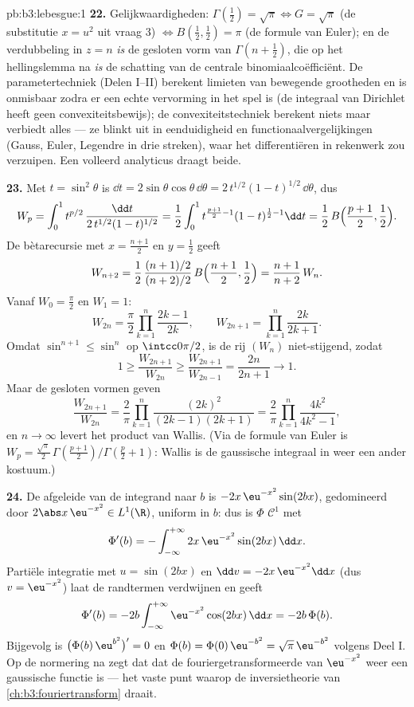 \begin{solution}{pb:b3:lebesgue:1}
\textbf{22.} Gelijkwaardigheden: $\Gamma(\frac12) = \sqrt\pi
\Leftrightarrow G = \sqrt\pi$ (de substitutie $x = u^2$ uit vraag
3) $\Leftrightarrow B(\frac12, \frac12) = \pi$ (de formule van
Euler); en de verdubbeling in $z = n$ \emph{is} de gesloten vorm
van $\Gamma(n + \frac12)$, die op het hellingslemma na \emph{is}
de schatting van de centrale binomiaalcoëfficiënt. De
parametertechniek (Delen I--II) berekent limieten van bewegende
grootheden en is onmisbaar zodra er een echte vervorming in het
spel is (de integraal van Dirichlet heeft geen convexiteitsbewijs);
de convexiteitstechniek berekent niets maar verbiedt alles --- ze
blinkt uit in eenduidigheid en functionaalvergelijkingen (Gauss,
Euler, Legendre in drie streken), waar het differentiëren in
rekenwerk zou verzuipen. Een volleerd analyticus draagt beide.

\textbf{23.} Met $t = \sin^2\theta$ is $\dd t =
2\sin\theta\cos\theta\,\dd\theta = 2\,t^{1/2}(1-t)^{1/2}\,
\dd\theta$, dus
\[
W_p = \int_0^1 t^{p/2}\,
\frac{\dd t}{2\,t^{1/2}(1-t)^{1/2}}
= \frac12\int_0^1 t^{\frac{p+1}2 - 1}(1-t)^{\frac12 - 1}\dd t
= \frac12\,B\Bigl(\frac{p+1}2, \frac12\Bigr).
\]
De bètarecursie met $x = \frac{n+1}2$ en $y = \frac12$ geeft
\[
W_{n+2} = \frac12\,
\frac{(n+1)/2}{(n+2)/2}\,B\Bigl(\frac{n+1}2, \frac12\Bigr)
= \frac{n+1}{n+2}\,W_n .
\]
Vanaf $W_0 = \frac\pi2$ en $W_1 = 1$:
\[
W_{2n} = \frac\pi2\prod_{k=1}^n\frac{2k-1}{2k},
\qquad
W_{2n+1} = \prod_{k=1}^n\frac{2k}{2k+1} .
\]
Omdat $\sin^{n+1} \leq \sin^n$ op $\intcc0{\pi/2}$, is de rij
$(W_n)$ niet-stijgend, zodat
\[
1 \geq \frac{W_{2n+1}}{W_{2n}} \geq
\frac{W_{2n+1}}{W_{2n-1}} = \frac{2n}{2n+1}
\longrightarrow 1 .
\]
Maar de gesloten vormen geven
\[
\frac{W_{2n+1}}{W_{2n}} = \frac2\pi
\prod_{k=1}^n\frac{(2k)^2}{(2k-1)(2k+1)}
= \frac2\pi\prod_{k=1}^n\frac{4k^2}{4k^2-1},
\]
en $n \to \infty$ levert het product van Wallis. (Via de formule
van Euler is $W_p = \frac{\sqrt\pi}2\,
\Gamma(\frac{p+1}2)/\Gamma(\frac p2 + 1)$: Wallis is de gaussische
integraal in weer een ander kostuum.)

\textbf{24.} De afgeleide van de integrand naar $b$ is
$-2x\,\eu^{-x^2}\sin(2bx)$, gedomineerd door $2\abs
x\,\eu^{-x^2} \in L^1(\R)$, uniform in $b$: dus is $\Phi$
$\mathcal C^1$ met
\[
\Phi'(b) = -\int_{-\infty}^{+\infty}
2x\,\eu^{-x^2}\sin(2bx)\,\dd x .
\]
Partiële integratie met $u = \sin(2bx)$ en $\dd v =
-2x\,\eu^{-x^2}\dd x$ (dus $v = \eu^{-x^2}$) laat de randtermen
verdwijnen en geeft
\[
\Phi'(b) = -2b\int_{-\infty}^{+\infty}
\eu^{-x^2}\cos(2bx)\,\dd x = -2b\,\Phi(b).
\]
Bijgevolg is $\bigl(\Phi(b)\,\eu^{b^2}\bigr)' = 0$ en $\Phi(b) =
\Phi(0)\,\eu^{-b^2} = \sqrt\pi\,\eu^{-b^2}$ volgens Deel I. Op de
normering na zegt dat dat de fouriergetransformeerde van
$\eu^{-x^2}$ weer een gaussische functie is --- het vaste punt
waarop de inversietheorie van \cref{ch:b3:fouriertransform}
draait.


\end{solution}
